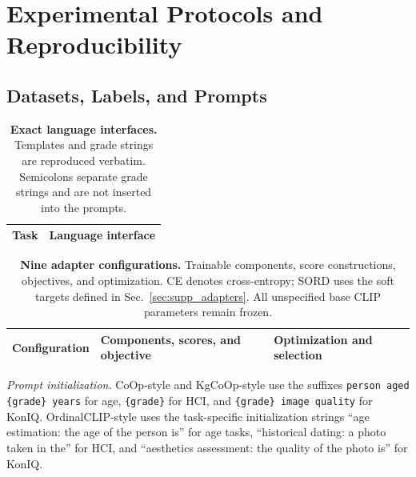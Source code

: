\section{Experimental Protocols and Reproducibility}
\label{sec:supp_protocols}


\subsection{Datasets, Labels, and Prompts}
\label{sec:supp_data_prompts}

\begin{table}[!ht]
\centering
\caption{\textbf{Exact language interfaces.}
Templates and grade strings are reproduced verbatim.
Semicolons separate grade strings and are not inserted into the prompts.}
\label{tab:supp_f_prompts}
\begingroup
\fontsize{8}{9.5}\selectfont
\setlength{\tabcolsep}{3pt}
\renewcommand{\arraystretch}{1}
\begin{tabularx}{\columnwidth}{
  @{}
  >{\raggedright\arraybackslash}p{}
  >{\raggedright\arraybackslash}X
  @{}
}
\toprule
Task & Language interface\\
\midrule

\end{tabularx}
\endgroup
\end{table}

\begin{table}[!t]
\centering
\caption{\textbf{Nine adapter configurations.}
Trainable components, score constructions, objectives, and optimization.
CE denotes cross-entropy; SORD uses the soft targets defined in Sec.~\ref{sec:supp_adapters}.
All unspecified base CLIP parameters remain frozen.}
\label{tab:supp_f_adapters}
\begingroup
\fontsize{8}{9.5}\selectfont
\setlength{\tabcolsep}{4pt}
\renewcommand{\arraystretch}{1}
\begin{tabularx}{\textwidth}{
  @{}
  >{\raggedright\arraybackslash}p{}
  >{\raggedright\arraybackslash}p{}
  >{\raggedright\arraybackslash}X
  @{}
}
\toprule
Configuration & Components, scores, and objective & Optimization and selection\\
\midrule

\end{tabularx}

\medskip
\begin{minipage}{\textwidth}
\noindent\textit{Prompt initialization.}
CoOp-style and KgCoOp-style use the suffixes \texttt{person aged \{grade\} years} for age, \texttt{\{grade\}} for HCI, and \texttt{\{grade\} image quality} for KonIQ.
OrdinalCLIP-style uses the task-specific initialization strings ``age estimation: the age of the person is'' for age tasks, ``historical dating: a photo taken in the'' for HCI, and ``aesthetics assessment: the quality of the photo is'' for KonIQ.
\end{minipage}
\endgroup
\end{table}

